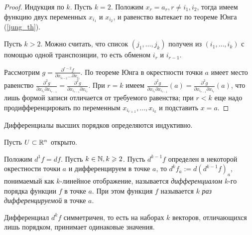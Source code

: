 \begin{proof}
    Индукция по $k$. Пусть $k = 2$. Положим $x_{r} = a_{r}, r \neq i_{1},i_{2}$, тогда имеем функцию двух переменных $x_{i_{1}}$ и $x_{i_{2}}$, и равенство вытекает по теореме Юнга (\ref{jung_th}).

    Пусть $k > 2$. Можно считать, что список $(j_{1}, \ldots, j_{k})$ получен из $(i_{1}, \ldots, i_{k})$ с помощью одной транспозиции, то есть обменом $i_{r}$ и $i_{r - 1}$.

    Рассмотрим $g = \frac{\partial^{r - 2} f}{\partial x_{i_{r - 2}} \ldots \partial x_{i_{1}}}$. По теореме Юнга в окрестности точки $a$ имеет место равенство $\frac{\partial^2 g}{\partial x_{i_{r}} \partial x_{i_{r - 1}}} = \frac{\partial^2 g}{\partial x_{i_{r - 1}} \partial x_{i_{r}}}$. При $r = k$ имеем $\frac{\partial^2 g}{\partial x_{i_{r}} \partial x_{i_{r - 1}}}(a) = \frac{\partial^2 g}{\partial x_{i_{r - 1}} \partial x_{i_{r}}}(a)$, что лишь формой записи отличается от требуемого равенства; при $r < k$ еще надо продифференцировать по переменным $x_{i_{r + 1}}, \ldots, x_{i_{k}}$ и подставить $x = a$.
\end{proof}

Дифференциалы высших порядков определяются индуктивно.

Пусть $U \subset \mathbb{R}^{n}$ открыто.

\begin{definition}
    Положим $d^{1}f = df$. Пусть $k \in \mathbb{N}, k \geqslant 2$. Пусть $d^{k - 1}f$ определен в некоторой окрестности точки $a$ и дифференцируем в точке $a$, то $d^{k}f_{a} := d(d^{k - 1}f)_{a}$, понимаемый как $k$-линейное отображение, называется \textit{дифференциалом} $k$-го порядка функции $f$ в точке $a$. При этом функция $f$ называется $k$ \textit{раз дифференцируемой} в точке $a$.
\end{definition}

\begin{lemma}
    Дифференциал $d^{k}f$ симметричен, то есть на наборах $k$ векторов, отличающихся лишь порядком, принимает одинаковые значения.
\end{lemma}


